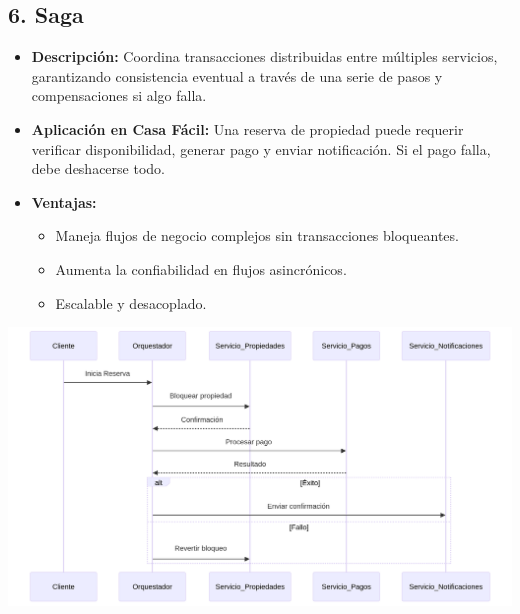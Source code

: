 	\subsection*{6. Saga}
		\begin{itemize}
			\item \textbf{Descripción:} Coordina transacciones distribuidas entre múltiples servicios, garantizando consistencia eventual a través de una serie de pasos y compensaciones si algo falla.  
			\item \textbf{Aplicación en Casa Fácil:} Una reserva de propiedad puede requerir verificar disponibilidad, generar pago y enviar notificación. Si el pago falla, debe deshacerse todo.  
			\item \textbf{Ventajas:}
			\begin{itemize}
				\item Maneja flujos de negocio complejos sin transacciones bloqueantes.
				\item Aumenta la confiabilidad en flujos asincrónicos.
				\item Escalable y desacoplado.
			\end{itemize}
		\end{itemize}
		\begin{center}
			\includegraphics[width=\linewidth]{figures/patterns/SAGA.png}
			\label{fig:img7}
		\end{center}
	
